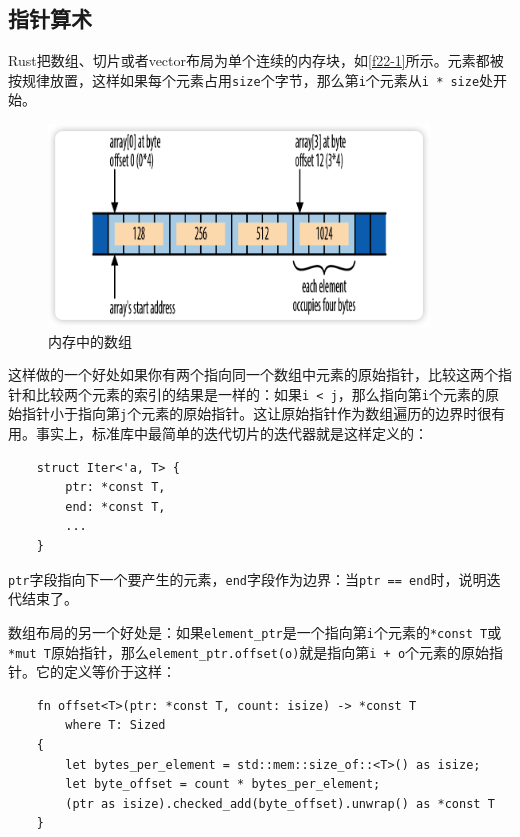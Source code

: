 \subsection{指针算术}

Rust把数组、切片或者vector布局为单个连续的内存块，如\autoref{f22-1}所示。元素都被按规律放置，这样如果每个元素占用\texttt{size}个字节，那么第\texttt{i}个元素从\texttt{i * size}处开始。

\begin{figure}[htbp]
    \centering
    \includegraphics[width=0.9\textwidth]{../img/f22-1.png}
    \caption{内存中的数组}
    \label{f22-1}
\end{figure}

这样做的一个好处如果你有两个指向同一个数组中元素的原始指针，比较这两个指针和比较两个元素的索引的结果是一样的：如果\texttt{i < j}，那么指向第\texttt{i}个元素的原始指针小于指向第\texttt{j}个元素的原始指针。这让原始指针作为数组遍历的边界时很有用。事实上，标准库中最简单的迭代切片的迭代器就是这样定义的：
\begin{verbatim}
    struct Iter<'a, T> {
        ptr: *const T,
        end: *const T,
        ...
    }
\end{verbatim}

\texttt{ptr}字段指向下一个要产生的元素，\texttt{end}字段作为边界：当\texttt{ptr == end}时，说明迭代结束了。

数组布局的另一个好处是：如果\texttt{element\_ptr}是一个指向第\texttt{i}个元素的\texttt{*const T}或\texttt{*mut T}原始指针，那么\texttt{element\_ptr.offset(o)}就是指向第\texttt{i + o}个元素的原始指针。它的定义等价于这样：
\begin{verbatim}
    fn offset<T>(ptr: *const T, count: isize) -> *const T
        where T: Sized
    {
        let bytes_per_element = std::mem::size_of::<T>() as isize;
        let byte_offset = count * bytes_per_element;
        (ptr as isize).checked_add(byte_offset).unwrap() as *const T
    }
\end{verbatim}

